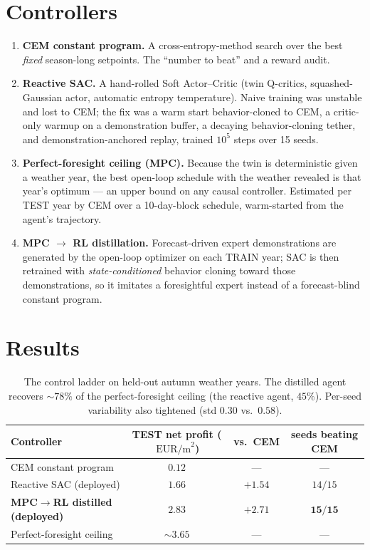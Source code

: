 \documentclass[11pt]{article}
\newcommand{\eurpm}{\,\text{EUR/m}^2}
\begin{document}
\section{Controllers}
\begin{enumerate}[leftmargin=1.4em]
\item \textbf{CEM constant program.} A cross-entropy-method search over the best
\emph{fixed} season-long setpoints. The ``number to beat'' and a reward audit.
\item \textbf{Reactive SAC.} A hand-rolled Soft Actor--Critic (twin Q-critics,
squashed-Gaussian actor, automatic entropy temperature). Naive training was
unstable and lost to CEM; the fix was a warm start behavior-cloned to CEM, a
critic-only warmup on a demonstration buffer, a decaying behavior-cloning tether,
and demonstration-anchored replay, trained $10^5$ steps over 15 seeds.
\item \textbf{Perfect-foresight ceiling (MPC).} Because the twin is deterministic
given a weather year, the best open-loop schedule with the weather revealed is
that year's optimum --- an upper bound on any causal controller. Estimated per TEST
year by CEM over a 10-day-block schedule, warm-started from the agent's trajectory.
\item \textbf{MPC $\to$ RL distillation.} Forecast-driven expert demonstrations are
generated by the open-loop optimizer on each TRAIN year; SAC is then retrained with
\emph{state-conditioned} behavior cloning toward those demonstrations, so it
imitates a foresightful expert instead of a forecast-blind constant program.
\end{enumerate}

\section{Results}
\begin{table}[h]
\centering
\begin{tabular}{lccc}
\toprule
Controller & TEST net profit ($\eurpm$) & vs.\ CEM & seeds beating CEM \\
\midrule
CEM constant program            & $0.12$              & ---     & --- \\
Reactive SAC (deployed)         & $1.66$              & $+1.54$ & $14/15$ \\
\textbf{MPC$\to$RL distilled (deployed)} & $\mathbf{2.83}$ & $\mathbf{+2.71}$ & $\mathbf{15/15}$ \\
Perfect-foresight ceiling       & $\sim 3.65$         & ---     & --- \\
\bottomrule
\end{tabular}
\caption{The control ladder on held-out autumn weather years. The distilled agent
recovers $\sim 78\%$ of the perfect-foresight ceiling (the reactive agent, $45\%$).
Per-seed variability also tightened (std $0.30$ vs.\ $0.58$).}
\end{table}
\end{document}
